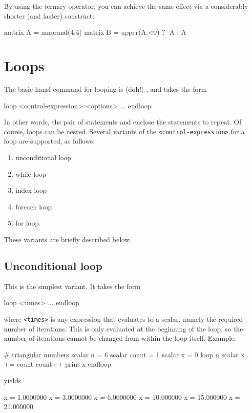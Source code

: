 By using the ternary operator, you can achieve the same effect via a
considerably shorter (and faster) construct:
\begin{code}
matrix A = mnormal(4,4)
matrix B = upper(A.<0) ? -A : A
\end{code}


\section{Loops}
\label{sec:hr-loops}

The basic hansl command for looping is (doh!) , and
takes the form
\begin{code}
loop <control-expression> <options>
    ...
endloop
\end{code}
In other words, the pair of statements  and 
enclose the statements to repeat. Of course, loops can be nested.
Several variants of the \texttt{<control-expression>} for a loop are
supported, as follows:
\begin{enumerate}
\item unconditional loop
\item while loop
\item index loop
\item foreach loop
\item for loop.
\end{enumerate}
These variants are briefly described below.

\subsection{Unconditional loop}

This is the simplest variant. It takes the form
\begin{code}
loop <times>
   ...
endloop
\end{code}
where \texttt{<times>} is any expression that evaluates to a scalar,
namely the required number of iterations. This is only evaluated at
the beginning of the loop, so the number of iterations cannot be
changed from within the loop itself. Example:
\begin{code}
# triangular numbers
scalar n = 6
scalar count = 1
scalar x = 0
loop n
    scalar x += count
    count++
    print x
endloop
\end{code}
yields
\begin{code}
              x =  1.0000000
              x =  3.0000000
              x =  6.0000000
              x =  10.000000
              x =  15.000000
              x =  21.000000
\end{code}

